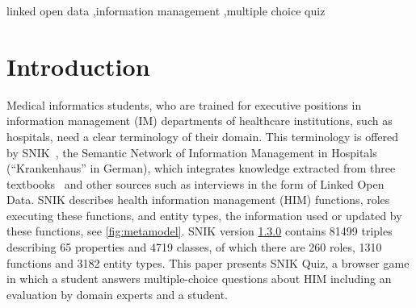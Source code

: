 \documentclass{IOS-Book-Article}     %
\newcommand{\citep}{\cite}%
\newcommand{\snikversion}{1.3.0}
\newcommand{\snikversionlink}{\href{https://github.com/snikproject/ontology/releases/tag/\snikversion}{\snikversion}}
\newcommand{\sniktriples}{\num{81499}}
\newcommand{\snikclasses}{\num{4719}}
\newcommand{\snikroles}{260}
\newcommand{\snikfunctions}{\num{1310}}
\newcommand{\snikentitytypes}{\num{3182}}
\newcommand{\snikproperties}{65}
\begin{document}
\begin{frontmatter}
\begin{abstract}
\end{abstract}


\begin{keyword}
linked open data \sep information management \sep multiple choice quiz
\end{keyword}
\end{frontmatter}

\section{Introduction}
Medical informatics students, who are trained for executive positions in information management (IM) departments of healthcare institutions, such as hospitals, need a clear terminology of their domain.
This terminology is offered by SNIK~\citep{semantischesnetz,sniktec}, the Semantic Network of Information Management in Hospitals (\enquote{Krankenhaus} in German), which integrates knowledge extracted from three textbooks~\citep{bb,ob,he} and other sources such as interviews in the form of Linked Open Data.
SNIK describes health information management (HIM) functions, roles executing these functions, and entity types, the information used or updated by these functions, see \cref{fig:metamodel}.
SNIK version \snikversionlink{} contains \sniktriples{} triples describing \snikproperties{} properties and \snikclasses{} classes, of which there are \snikroles{} roles, \snikfunctions{} functions and \snikentitytypes{} entity types.
This paper presents SNIK Quiz, a browser game in which a student answers multiple-choice questions about HIM including an evaluation by domain experts and a student.
\end{document}
